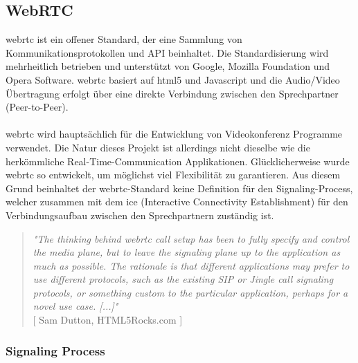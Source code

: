 \subsection{WebRTC}
\label{kap:webrtc}
\gls{webrtc} ist ein offener Standard, der eine Sammlung von Kommunikationsprotokollen und API beinhaltet. Die Standardisierung wird mehrheitlich betrieben und unterstützt von Google, Mozilla Foundation und Opera Software. \gls{webrtc} basiert auf \gls{html}5 und Javascript und die Audio/Video Übertragung erfolgt über eine direkte Verbindung zwischen den Sprechpartner (Peer-to-Peer).
\\
\\
\gls{webrtc} wird hauptsächlich für die Entwicklung von Videokonferenz Programme verwendet. Die Natur dieses Projekt ist allerdings nicht dieselbe wie die herkömmliche Real-Time-Communication Applikationen. Glücklicherweise wurde \gls{webrtc} so entwickelt, um möglichst viel Flexibilität zu garantieren. Aus diesem Grund beinhaltet der \gls{webrtc}-Standard keine Definition für den Signaling-Process, welcher zusammen mit dem \gls{ice} (Interactive Connectivity Establishment) für den Verbindungsaufbau zwischen den Sprechpartnern zuständig ist. 

\begin{quote}
	\textit{
		"The thinking behind \gls{webrtc} call setup has been to fully specify and control the media plane, but to leave the signaling plane up to the application as much as possible. The rationale is that different applications may prefer to use different protocols, such as the existing SIP or Jingle call signaling protocols, or something custom to the particular application, perhaps for a novel use case. [...]"
	} 
	\\
	\nocite{} [ Sam Dutton, HTML5Rocks.com ]
\end{quote}

\subsubsection{Signaling Process}
\label{kap:signaling}

